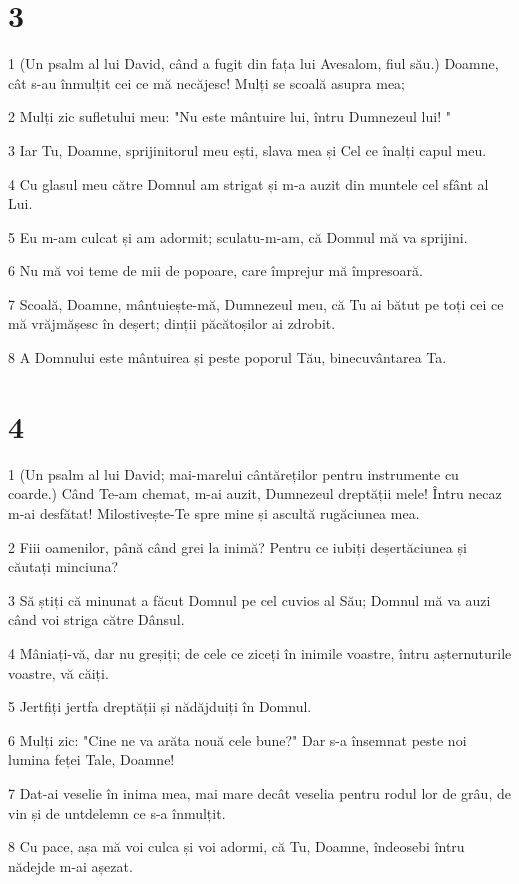 \chapter{3}

\par 1 (Un psalm al lui David, când a fugit din fața lui Avesalom, fiul său.) Doamne, cât s-au înmulțit cei ce mă necăjesc! Mulți se scoală asupra mea;
\par 2 Mulți zic sufletului meu: "Nu este mântuire lui, întru Dumnezeul lui! "
\par 3 Iar Tu, Doamne, sprijinitorul meu ești, slava mea și Cel ce înalți capul meu.
\par 4 Cu glasul meu către Domnul am strigat și m-a auzit din muntele cel sfânt al Lui.
\par 5 Eu m-am culcat și am adormit; sculatu-m-am, că Domnul mă va sprijini.
\par 6 Nu mă voi teme de mii de popoare, care împrejur mă împresoară.
\par 7 Scoală, Doamne, mântuiește-mă, Dumnezeul meu, că Tu ai bătut pe toți cei ce mă vrăjmășesc în deșert; dinții păcătoșilor ai zdrobit.
\par 8 A Domnului este mântuirea și peste poporul Tău, binecuvântarea Ta.

\chapter{4}

\par 1 (Un psalm al lui David; mai-marelui cântăreților pentru instrumente cu coarde.) Când Te-am chemat, m-ai auzit, Dumnezeul dreptății mele! Întru necaz m-ai desfătat! Milostivește-Te spre mine și ascultă rugăciunea mea.
\par 2 Fiii oamenilor, până când grei la inimă? Pentru ce iubiți deșertăciunea și căutați minciuna?
\par 3 Să știți că minunat a făcut Domnul pe cel cuvios al Său; Domnul mă va auzi când voi striga către Dânsul.
\par 4 Mâniați-vă, dar nu greșiți; de cele ce ziceți în inimile voastre, întru așternuturile voastre, vă căiți.
\par 5 Jertfiți jertfa dreptății și nădăjduiți în Domnul.
\par 6 Mulți zic: "Cine ne va arăta nouă cele bune?" Dar s-a însemnat peste noi lumina feței Tale, Doamne!
\par 7 Dat-ai veselie în inima mea, mai mare decât veselia pentru rodul lor de grâu, de vin și de untdelemn ce s-a înmulțit.
\par 8 Cu pace, așa mă voi culca și voi adormi, că Tu, Doamne, îndeosebi întru nădejde m-ai așezat.

